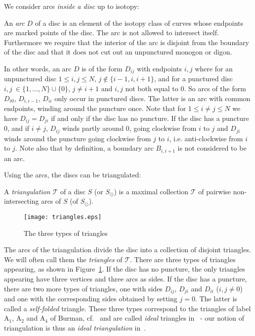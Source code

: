 \documentclass[a4paper]{amsart}
\begin{document}
We consider arcs {\em inside a disc} up to isotopy:
\begin{definition} \label{def:arc}
An {\em arc} $D$ of a disc is an element
of the isotopy class of curves whose
endpoints are marked points of the disc. The arc is not
allowed to intersect itself.
Furthermore we require that the interior of the
arc is disjoint from the boundary of the disc and that it does
not cut out an unpunctured monogon or digon.
\end{definition}

In other words, an arc $D$ is of the form
$D_{ij}$ with endpoints $i,j$ where
for an unpunctured disc $1\le i,j\le N$,
$j\notin\{i-1,i,i+1\}$, and
for a punctured disc
$i,j\ \in\{1,\dots,N\}\cup\{0\}$, $j\neq i+1$ and
$i,j$ not both equal to $0$.
So arcs of the form $D_{i0}$, $D_{i,i-1}$,
$D_{ii}$ only occur in punctured discs. The latter is an
arc with common endpoints, winding around the puncture once.
Note that for $1\le i\neq j\le N$ we have
$D_{ij}=D_{ji}$ if and
only if the disc has no puncture. If the disc has a puncture
$0$, and if $i\neq j$, $D_{ij}$ winds partly around $0$, going
clockwise
from $i$ to $j$ and $D_{ji}$ winds around the puncture going
clockwise
from $j$ to $i$, i.e. anti-clockwise
from $i$ to $j$.
Note also that by definition, a boundary arc $B_{i,i+1}$ is not
considered to
be an arc.

Using the arcs, the discs can be triangulated: 

\begin{definition}
A {\em triangulation} ${\mathcal T}$ of a disc $S$ (or $S_{\odot}$)
is a maximal collection ${\mathcal T}$ of pairwise non-intersecting arcs
of $S$ (of $S_{\odot}$).
\end{definition}

\begin{figure}
\begin{center}
\texttt{[image: triangles.eps]}
\end{center}
\caption{The three types of triangles}
\label{fig:triangles}
\end{figure}

The arcs of the triangulation divide the disc into a collection of
disjoint triangles. We will often call them the {\em triangles} of
${\mathcal T}$.
There are three types of triangles appearing, as shown
in Figure~\ref{fig:triangles}.
If the disc has no puncture, the only triangles appearing have
three vertices and three arcs as sides.
If the disc has a puncture, there are two more types of triangles,
one with sides $D_{ij}$, $D_{ji}$ and $D_{ii}$ ($i,j\neq 0$)
and one with
the corresponding sides obtained by setting $j=0$.
The latter is called a {\em self-folded} triangle.
These three types correspond to the triangles of label A$_1$,
A$_2$ and A$_4$ of Burman, cf.~\cite{burman99} and are called
{\em ideal} triangles in~\cite{fst06} - our notion of triangulation
is thus an {\em ideal triangulation} in~\cite{fst06}.
\end{document}
